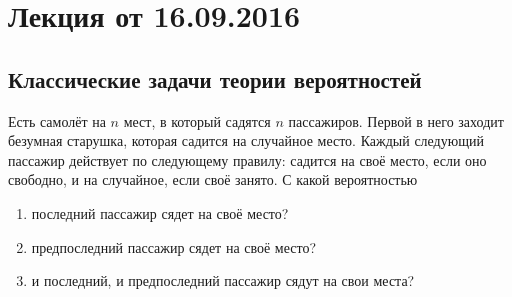 \section{Лекция от 16.09.2016}
\subsection{Классические задачи теории вероятностей}
\begin{problem}
    Есть самолёт на \(n\) мест, в который садятся \(n\) пассажиров. Первой в него заходит безумная старушка, которая садится на случайное место. Каждый следующий пассажир действует по следующему правилу: садится на своё место, если оно свободно, и на случайное, если своё занято. С какой вероятностью
    \begin{enumerate}
        \item последний пассажир сядет на своё место?
        \item предпоследний пассажир сядет на своё место?
        \item и последний, и предпоследний пассажир сядут на свои места?
    \end{enumerate}
\end{problem}
